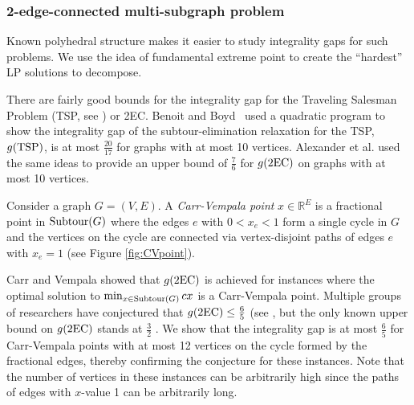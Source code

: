 \subsubsection{2-edge-connected multi-subgraph problem}
\label{sec:2EC-intro}
Known polyhedral structure makes it easier to study integrality gaps for such problems. We use the idea of fundamental extreme point \cite{carrravi,boydcarr,Carr2004} to create the ``hardest'' LP solutions to decompose.

There are fairly good bounds for the integrality gap for the Traveling Salesman Problem (TSP, see \cite{tspbook}) or 2EC.
Benoit and Boyd~\cite{TSPcompute} used a quadratic program to show the integrality gap of the subtour-elimination relaxation for the TSP, $g(\operatorname{{{TSP}}})$, is at most $\frac{20}{17}$ for graphs with at most 10 vertices. Alexander et al. \cite{alexander2006integrality} used the same ideas to provide an upper bound of $\frac{7}{6}$ for $g(\2ec)$ on graphs with at most 10 vertices. 

Consider a graph $G=(V,E)$. A \textit{Carr-Vempala point} $x\in \mathbb{R}^E$ is a fractional point in $\operatorname{{Subtour}}(G)$ where the edges $e$ with $0<x_e<1$ form a single cycle in $G$ and the vertices on the cycle are connected via vertex-disjoint paths of edges $e$ with $x_e =1$ (see Figure \ref{fig:CVpoint}).

Carr and Vempala \cite{Carr2004} showed that $g(\2ec)$ is achieved for instances where the optimal solution to $\min_{x\in \operatorname{{Subtour}}(G)}cx$ is a Carr-Vempala point. Multiple groups of researchers have conjectured that $g(\2ec)\leq \frac{6}{5}$ (see \cite{alexander2006integrality,boydlegault,hn19}, but the only known upper bound on $g(\2ec)$ stands at $\frac{3}{2}$ \cite{wolsey}. We show that the integrality gap is at most $\frac{6}{5}$ for Carr-Vempala points with at most 12 vertices on the cycle formed by the fractional edges, thereby confirming the conjecture for these instances.
 
Note that the number of vertices in these instances can be arbitrarily high since the paths of edges with $x$-value 1 can be arbitrarily long.

